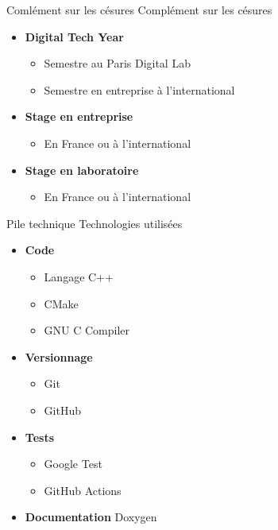 \documentclass[french, 12pt]{beamer}
\begin{document}
\begin{frame}{Comlément sur les césures}
Complément sur les césures
\begin{itemize}
    \item \textbf{Digital Tech Year}
    \begin{itemize}
        \item Semestre au Paris Digital Lab
        \item Semestre en entreprise à l'international
    \end{itemize}
    \item \textbf{Stage en entreprise}
    \begin{itemize}
        \item En France ou à l'international
    \end{itemize}
    \item \textbf{Stage en laboratoire}
    \begin{itemize}
        \item En France ou à l'international
    \end{itemize}
\end{itemize}
\end{frame}

\begin{frame}{Pile technique}
Technologies utilisées
\begin{itemize}
    \item \textbf{Code}
    \begin{itemize}
        \item Langage C++
        \item CMake
        \item GNU C Compiler
    \end{itemize}
    \item \textbf{Versionnage}
    \begin{itemize}
        \item Git
        \item GitHub
    \end{itemize}
    \item \textbf{Tests}
    \begin{itemize}
        \item Google Test
        \item GitHub Actions
    \end{itemize}
    \item \textbf{Documentation} Doxygen
\end{itemize}
\end{frame}
\end{document}
